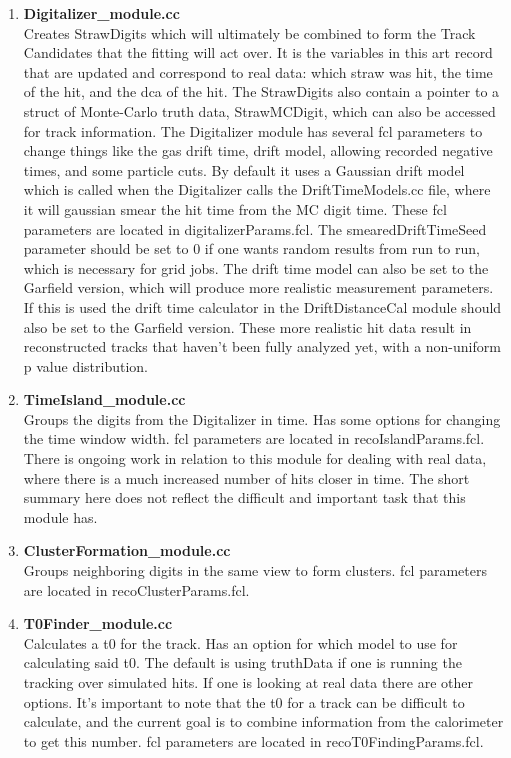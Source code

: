     \begin{enumerate}

          \item{\bf{Digitalizer\_module.cc}} \\
          Creates StrawDigits which will ultimately be combined to form the Track Candidates that the fitting will act over. It is the variables in this art record that are updated and correspond to real data: which straw was hit, the time of the hit, and the dca of the hit. The StrawDigits also contain a pointer to a struct of Monte-Carlo truth data, StrawMCDigit, which can also be accessed for track information. The Digitalizer module has several fcl parameters to change things like the gas drift time, drift model, allowing recorded negative times, and some particle cuts. By default it uses a Gaussian drift model which is called when the Digitalizer calls the DriftTimeModels.cc file, where it will gaussian smear the hit time from the MC digit time. These fcl parameters are located in digitalizerParams.fcl. The smearedDriftTimeSeed parameter should be set to 0 if one wants random results from run to run, which is necessary for grid jobs. The drift time model can also be set to the Garfield version, which will produce more realistic measurement parameters. If this is used the drift time calculator in the DriftDistanceCal module should also be set to the Garfield version. These more realistic hit data result in reconstructed tracks that haven't been fully analyzed yet, with a non-uniform p value distribution.

          \item{\bf{TimeIsland\_module.cc}} \\
          Groups the digits from the Digitalizer in time. Has some options for changing the time window width. fcl parameters are located in recoIslandParams.fcl. There is ongoing work in relation to this module for dealing with real data, where there is a much increased number of hits closer in time. The short summary here does not reflect the difficult and important task that this module has.

          \item{\bf{ClusterFormation\_module.cc}} \\
          Groups neighboring digits in the same view to form clusters. fcl parameters are located in recoClusterParams.fcl.

          \item{\bf{T0Finder\_module.cc}} \\
          Calculates a t0 for the track. Has an option for which model to use for calculating said t0. The default is using truthData if one is running the tracking over simulated hits. If one is looking at real data there are other options. It's important to note that the t0 for a track can be difficult to calculate, and the current goal is to combine information from the calorimeter to get this number. fcl parameters are located in recoT0FindingParams.fcl.


\end{enumerate}
